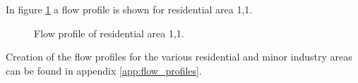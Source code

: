 In figure \ref{fig:flow_profile_thulevej} a flow profile is shown for residential area 1,1. 


\begin{figure}[H]
\centering

\caption{Flow profile of residential area 1,1.}
\label{fig:flow_profile_thulevej}
\end{figure}  

Creation of the flow profiles for the various residential and minor industry areas can be found in appendix \ref{app:flow_profiles}.


